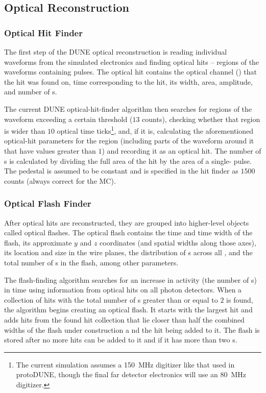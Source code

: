 \subsection{Optical Reconstruction}

\subsubsection{Optical Hit Finder}
\label{sec:OpticalHitFinder}
The first step of the DUNE optical reconstruction is reading
individual waveforms from the simulated  electronics
and finding optical hits -- regions of the waveforms containing pulses.
The optical hit contains the optical channel () that the hit
was found on, time corresponding to the hit, its width,
area, amplitude, and number of \phel{}s.


The current DUNE optical-hit-finder algorithm then searches for regions of the waveform
exceeding a certain threshold ($13$  counts), checking whether that region
is wider than $10$ optical time ticks\footnote{The current simulation assumes a 
\SI{150}{MHz} digitizer like that used in protoDUNE, though the final far detector electronics
will use an \SI{80}{MHz} digitizer.}, and, if it is, calculating the aforementioned
optical-hit parameters for the region (including parts of the waveform around it
that have  values greater than $1$) and recording it as an optical hit.
The number of \phel{}s is calculated by dividing the full area of the hit
by the area of a single-\phel{} pulse.
The pedestal is assumed to be constant and is specified in the hit finder as $1500$  counts (always correct for the MC).


\subsubsection{Optical Flash Finder}
After optical hits are reconstructed, they are grouped into higher-level objects called optical flashes.
The optical flash contains the time and time width of the flash,
its approximate $y$ and $z$ coordinates (and spatial widths along those axes),
its location and size in the wire planes,
the distribution of \phel{}s across all ,
and the total number of \phel{}s in the flash, among other parameters.

The flash-finding algorithm searches for an increase in  activity
(the number of \phel{}s) in time using information from optical hits
on all photon detectors.
When a collection of hits with the total number of \phel{}s  
greater than or equal to $2$ is found, the algorithm begins creating an optical flash.
It starts with the largest hit and adds hits from the found hit collection 
that lie closer than half the combined widths of the flash under construction
a nd the hit being added to it.
The flash is stored after no more hits can be added to it
and if it has more than two \phel{}s.


